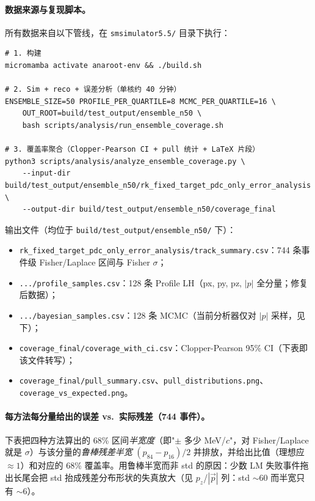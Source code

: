 \documentclass[a4paper, 11pt]{article}
\begin{document}
\paragraph{数据来源与复现脚本。}
所有数据来自以下管线，在 \texttt{smsimulator5.5/} 目录下执行：
\begin{verbatim}
# 1. 构建
micromamba activate anaroot-env && ./build.sh

# 2. Sim + reco + 误差分析（单核约 40 分钟）
ENSEMBLE_SIZE=50 PROFILE_PER_QUARTILE=8 MCMC_PER_QUARTILE=16 \
    OUT_ROOT=build/test_output/ensemble_n50 \
    bash scripts/analysis/run_ensemble_coverage.sh

# 3. 覆盖率聚合（Clopper-Pearson CI + pull 统计 + LaTeX 片段）
python3 scripts/analysis/analyze_ensemble_coverage.py \
    --input-dir  build/test_output/ensemble_n50/rk_fixed_target_pdc_only_error_analysis \
    --output-dir build/test_output/ensemble_n50/coverage_final
\end{verbatim}

输出文件（均位于 \texttt{build/test\_output/ensemble\_n50/} 下）：
\begin{itemize}[nosep]
  \item \texttt{rk\_fixed\_target\_pdc\_only\_error\_analysis/track\_summary.csv}：744 条事件级 Fisher/Laplace 区间与 Fisher $\sigma$；
  \item \texttt{.../profile\_samples.csv}：128 条 Profile LH（px, py, pz, $|p|$ 全分量；修复后数据）；
  \item \texttt{.../bayesian\_samples.csv}：128 条 MCMC（当前分析器仅对 $|p|$ 采样，见下）；
  \item \texttt{coverage\_final/coverage\_with\_ci.csv}：Clopper-Pearson 95\% CI（下表即该文件转写）；
  \item \texttt{coverage\_final/pull\_summary.csv}、\texttt{pull\_distributions.png}、\texttt{coverage\_vs\_expected.png}。
\end{itemize}

\paragraph{每方法每分量给出的误差 vs.\ 实际残差（744 事件）。}

下表把四种方法算出的 68\% 区间\emph{半宽度}（即"$\pm$ 多少 MeV/$c$"，对 Fisher/Laplace 就是 $\sigma$）与该分量的\emph{鲁棒残差半宽} $(p_{84}-p_{16})/2$ 并排放，并给出比值（理想应 $\approx 1$）和对应的 68\% 覆盖率。用鲁棒半宽而非 std 的原因：少数 LM 失败事件拖出长尾会把 std 抬成残差分布形状的失真放大（见 $p_z$/$|\vec p|$ 列：std $\sim 60$ 而半宽只有 $\sim 6$）。
\end{document}
